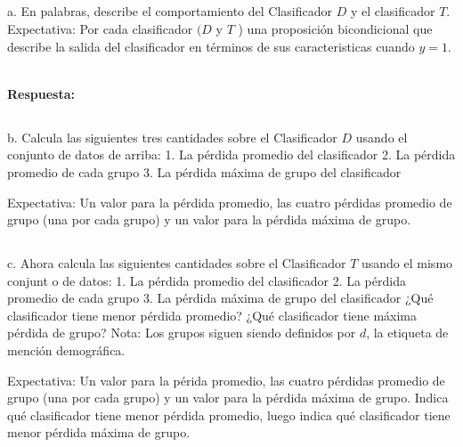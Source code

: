 \documentclass{article}
\begin{document}
\subsection{}
a. En palabras, describe el comportamiento del Clasificador $D$ y el clasificador $T$.\\
Expectativa: Por cada clasificador $(D$ y $T$ ) una proposición bicondicional que describe la salida del clasificador en términos de sus caracteristicas cuando $y=1$.

\\ \textbf{Respuesta:} \\


\subsection{}
b. Calcula las siguientes tres cantidades sobre el Clasificador $D$ usando el conjunto de datos de arriba:
1. La pérdida promedio del clasificador
2. La pérdida promedio de cada grupo
3. La pérdida máxima de grupo del clasificador

Expectativa: Un valor para la pérdida promedio, las cuatro pérdidas promedio de grupo (una por cada grupo) y un valor para la pérdida máxima de grupo.

\subsection{}
c. Ahora calcula las siguientes cantidades sobre el Clasificador $T$ usando el mismo conjunt o de datos:
1. La pérdida promedio del clasificador
2. La pérdida promedio de cada grupo
3. La pérdida máxima de grupo del clasificador ¿Qué clasificador tiene menor pérdida promedio? ¿Qué clasificador tiene máxima pérdida de grupo?
Nota: Los grupos siguen siendo definidos por $d$, la etiqueta de mención demográfica.

Expectativa: Un valor para la périda promedio, las cuatro pérdidas promedio de grupo (una por cada grupo) y un valor para la pérdida máxima de grupo. Indica qué clasificador tiene menor pérdida promedio, luego indica qué clasificador tiene menor pérdida máxima de grupo.
\end{document}
